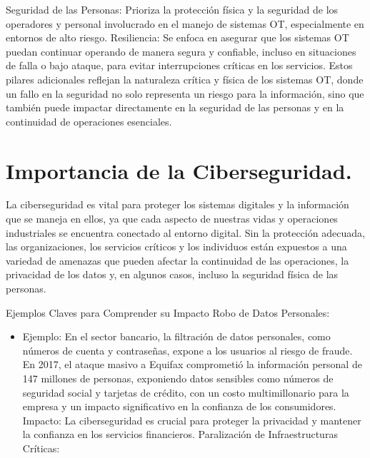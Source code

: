 \documentclass[
  letterpaper,
  DIV=11,
  numbers=noendperiod]{scrreprt}
\providecommand{\tightlist}{%
  \setlength{\itemsep}{0pt}\setlength{\parskip}{0pt}}\usepackage{longtable,booktabs,array}
\begin{document}
Seguridad de las Personas: Prioriza la protección física y la seguridad
de los operadores y personal involucrado en el manejo de sistemas OT,
especialmente en entornos de alto riesgo. Resiliencia: Se enfoca en
asegurar que los sistemas OT puedan continuar operando de manera segura
y confiable, incluso en situaciones de falla o bajo ataque, para evitar
interrupciones críticas en los servicios. Estos pilares adicionales
reflejan la naturaleza crítica y física de los sistemas OT, donde un
fallo en la seguridad no solo representa un riesgo para la información,
sino que también puede impactar directamente en la seguridad de las
personas y en la continuidad de operaciones esenciales.

\hypertarget{importancia-de-la-ciberseguridad.}{%
\section{Importancia de la
Ciberseguridad.}\label{importancia-de-la-ciberseguridad.}}

La ciberseguridad es vital para proteger los sistemas digitales y la
información que se maneja en ellos, ya que cada aspecto de nuestras
vidas y operaciones industriales se encuentra conectado al entorno
digital. Sin la protección adecuada, las organizaciones, los servicios
críticos y los individuos están expuestos a una variedad de amenazas que
pueden afectar la continuidad de las operaciones, la privacidad de los
datos y, en algunos casos, incluso la seguridad física de las personas.

Ejemplos Claves para Comprender su Impacto Robo de Datos Personales:

\begin{itemize}
\tightlist
\item
  Ejemplo: En el sector bancario, la filtración de datos personales,
  como números de cuenta y contraseñas, expone a los usuarios al riesgo
  de fraude. En 2017, el ataque masivo a Equifax comprometió la
  información personal de 147 millones de personas, exponiendo datos
  sensibles como números de seguridad social y tarjetas de crédito, con
  un costo multimillonario para la empresa y un impacto significativo en
  la confianza de los consumidores. Impacto: La ciberseguridad es
  crucial para proteger la privacidad y mantener la confianza en los
  servicios financieros. Paralización de Infraestructuras Críticas:
\end{itemize}
\end{document}
